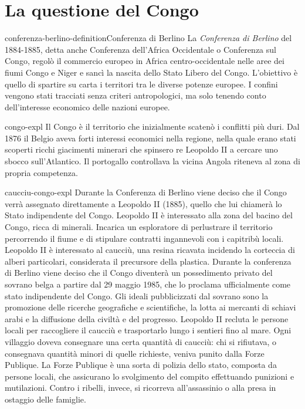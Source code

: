 \documentclass[preview]{standalone}
\begin{document}
\section{La questione del Congo}

\begin{snippetdefinition}{conferenza-berlino-definition}{Conferenza di Berlino}
    La \textit{Conferenza di Berlino} del 1884-1885,
    detta anche Conferenza dell'Africa Occidentale o Conferenza sul Congo,
    regolò il commercio europeo in Africa
    centro-occidentale nelle aree dei fiumi Congo e Niger e sancì la
    nascita dello Stato Libero del Congo.
    L'obiettivo è quello di spartire su carta i territori tra le diverse potenze europee. 
    I confini vengono stati tracciati senza criteri antropologici,
    ma solo tenendo conto dell'interesse economico
    delle nazioni europee.
\end{snippetdefinition}

\begin{snippet}{congo-expl}
    Il Congo è il territorio che inizialmente scatenò i conflitti più duri.
    Dal 1876 il Belgio aveva forti interessi economici nella regione, nella quale
    erano stati scoperti ricchi giacimenti minerari che spinsero re Leopoldo II a cercare
    uno sbocco sull'Atlantico. Il portogallo controllava la vicina Angola riteneva al zona di propria competenza.
\end{snippet}

\begin{snippet}{caucciu-congo-expl}
    Durante la Conferenza di Berlino viene deciso che il Congo verrà assegnato
    direttamente a Leopoldo II (1885), quello che lui chiamerà lo Stato indipendente del Congo.
    Leopoldo II è interessato alla zona del bacino del Congo, ricca di
    minerali. Incarica un esploratore di perlustrare il territorio percorrendo il fiume e di stipulare
    contratti ingannevoli con i capitribù locali. Leopoldo II è interessato al caucciù, una resina
    ricavata incidendo la corteccia di alberi particolari, considerata il precursore della plastica.
    Durante la conferenza di Berlino viene deciso che il Congo diventerà un possedimento
    privato del sovrano belga a partire dal 29 maggio 1985, che lo proclama ufficialmente come
    stato indipendente del Congo. Gli ideali pubblicizzati dal sovrano sono la promozione delle
    ricerche geografiche e scientifiche, la lotta ai mercanti di schiavi arabi e la diffusione della
    civiltà e del progresso. Leopoldo II recluta le persone locali per raccogliere il caucciù e
    trasportarlo lungo i sentieri fino al mare. Ogni villaggio doveva consegnare una certa
    quantità di caucciù: chi si rifiutava, o consegnava quantità minori di quelle richieste, veniva
    punito dalla Forze Publique. La Forze Publique è una sorta di polizia dello stato, composta
    da persone locali, che assicurano lo svolgimento del compito effettuando punizioni e
    mutilazioni. Contro i ribelli, invece, si ricorreva all'assassinio o alla presa in ostaggio delle
    famiglie.
\end{snippet}
\end{document}
